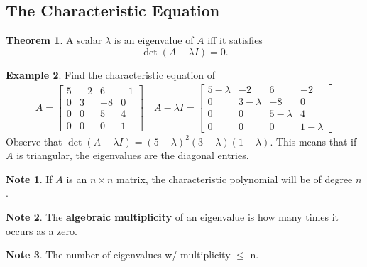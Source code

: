 \documentclass{article}
\numberwithin{equation}{section}
\theoremstyle{definition}
\newtheorem{thm}{Theorem}[subsection]
\newtheorem{ex}[thm]{Example}
\newtheorem{note}{Note}[subsection]
\newcommand{\x}{\times}
\theoremstyle{adefn}
\begin{document}
	\subsection{The Characteristic Equation}
	\begin{thm}
		A scalar $\lambda$ is an eigenvalue of $A$ iff it satisfies 
		$$\det(A - \lambda I) = 0.$$
	\end{thm}
	\begin{ex}
		Find the characteristic equation of 
		\begin{align*}
			A = \begin{bmatrix}
				5 & -2 & 6 & -1 \\
				0 & 3 & -8 & 0 \\
				0 & 0 & 5 & 4 \\
				0 & 0 & 0 & 1
			\end{bmatrix}\quad A-\lambda I = \begin{bmatrix}
				5-\lambda & -2 & 6 & -2 \\
				0 & 3-\lambda & -8 & 0 \\
				0 & 0 & 5-\lambda & 4 \\
				0 & 0 & 0 & 1-\lambda
			\end{bmatrix}
		\end{align*}
		Observe that $\det(A-\lambda I) = (5-\lambda)^2(3-\lambda)(1-\lambda)$. This means that if $A$ is triangular, the eigenvalues are the diagonal entries. 
	\end{ex}
	\begin{note}
		If $A$ is an $n \x n$ matrix, the characteristic polynomial will be of degree $n$. 
	\end{note}
	\begin{note}
		The \textbf{algebraic multiplicity} of an eigenvalue is how many times it occurs as a zero.
	\end{note}
	\begin{note}
		The number of eigenvalues w/ multiplicity $\leq$ n. 
	\end{note}
\end{document}
